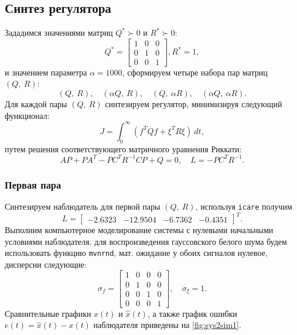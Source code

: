 \subsection{Синтез регулятора}

Зададимся значениями матриц $Q^*\succ0$ и $R^*\succ0$:
\begin{equation*}
    Q^*=\begin{bmatrix}
        1 & 0 & 0\\
        0 & 1 & 0\\
        0 & 0 & 1
    \end{bmatrix},
    R^*=1,
\end{equation*}
и значением параметра $\alpha=1000$, сформируем четыре набора пар матриц $(Q,\ R)$:
$$(Q,\ R),\quad (\alpha Q,\ R),\quad (Q,\ \alpha R),\quad (\alpha Q,\ \alpha R).$$
Для каждой пары $(Q,\ R)$ синтезируем регулятор, минимизируя следующий функционал:
\begin{equation}
    \label{eq:cost2}
    J=\int_0^{\infty}(f^TQf+\xi^TR\xi)\ dt,
\end{equation}
путем решения  соответствующего матричного уравнения Риккати:
\begin{equation}
    \label{eq:ric2}
    AP+PA^T-PC^TR^{-1}CP+Q=0,\quad L=-PC^TR^{-1}.
\end{equation}

\subsubsection{Первая пара}

Синтезируем наблюдатель для первой пары $(Q,\ R)$, используя \texttt{icare} получим
\begin{equation*}
    L=\begin{bmatrix}
        -2.6323&
        -12.9504&
         -6.7362&
         -0.4351
    \end{bmatrix}^T.
\end{equation*}
Выполним компьютерное моделирование системы с нулевыми начальными условиями
наблюдателя, для воспроизведения гауссовского белого шума будем использовать
функцию \texttt{mvnrnd}, мат. ожидание у обоих сигналов нулевое, дисперсии следующие:
\begin{equation*}
    \sigma_f=\begin{bmatrix}
        1 & 0 & 0 & 0\\
        0 & 1 & 0 & 0\\
        0 & 0 & 1 & 0\\
        0 & 0 & 0 & 1
    \end{bmatrix},\quad
    \sigma_\xi=1.
\end{equation*} 
Сравнительные графики $x(t)$ и $\hat x(t)$, а также
график ошибки $e(t)=\hat x(t)-x(t)$ наблюдателя
приведены на \autoref{fig:sys2sim1}.


